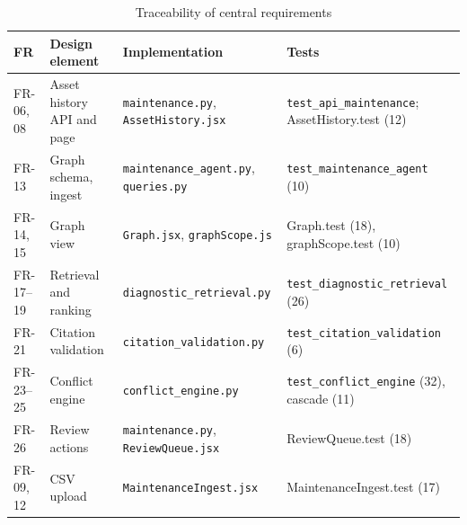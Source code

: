 \begin{table}[H]
\centering
\caption{Traceability of central requirements}
\label{tab:traceability}
\small
\begin{tabularx}{\textwidth}{@{}>{\raggedright\arraybackslash}p{} L L >{\raggedright\arraybackslash}p{0.22\textwidth}@{}}
\toprule
FR & Design element & Implementation & Tests \\
\midrule
FR-06, 08 & Asset history API and page & \texttt{maintenance.py}, \texttt{AssetHistory.jsx} & \texttt{test\_api\_maintenance}; AssetHistory.test (12) \\
FR-13 & Graph schema, ingest & \texttt{maintenance\_agent.py}, \texttt{queries.py} & \texttt{test\_maintenance\_agent} (10) \\
FR-14, 15 & Graph view & \texttt{Graph.jsx}, \texttt{graphScope.js} & Graph.test (18), graphScope.test (10) \\
FR-17--19 & Retrieval and ranking & \texttt{diagnostic\_retrieval.py} & \texttt{test\_diagnostic\_retrieval} (26) \\
FR-21 & Citation validation & \texttt{citation\_validation.py} & \texttt{test\_citation\_validation} (6) \\
FR-23--25 & Conflict engine & \texttt{conflict\_engine.py} & \texttt{test\_conflict\_engine} (32), cascade (11) \\
FR-26 & Review actions & \texttt{maintenance.py}, \texttt{ReviewQueue.jsx} & ReviewQueue.test (18) \\
FR-09, 12 & CSV upload & \texttt{MaintenanceIngest.jsx} & MaintenanceIngest.test (17) \\
\bottomrule
\end{tabularx}
\end{table}
